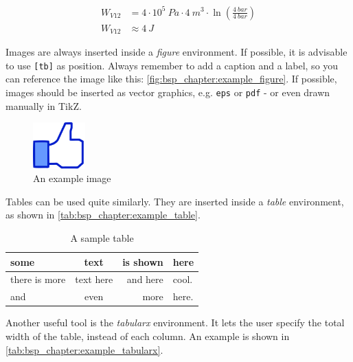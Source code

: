 \begin{equation}
    \begin{split}
        W_{V12} &= 4 \cdot 10^5\ Pa \cdot 4\ m^3 \cdot \ln(\frac{4\ bar}{4\ bar}) \\
        W_{V12} &\approx 4\ J
    \end{split}
\end{equation}

%
Images are always inserted inside a \emph{figure}
environment. If possible, it is advisable to use \texttt{[tb]} as position.
Always remember to add a caption and a label, so you can reference the image
like this: \autoref{fig:bsp_chapter:example_figure}. If possible, images should be
inserted as vector graphics, e.g. \texttt{eps} or \texttt{pdf} - or even drawn
manually in TikZ.

\begin{figure}[t]
    \centering
    \includegraphics[width=2cm]{chapters/Beispiel/images/thumbs_up.jpg}
    \caption{An example image}
    \label{fig:bsp_chapter:example_figure}
\end{figure}

Tables  can be used quite similarly. They are inserted inside a \emph{table} 
environment, as shown in \autoref{tab:bsp_chapter:example_table}.

\begin{table}[t]
    \centering
    \begin{tabular}{lcrp{4cm}} \toprule
        some          & text      & is shown & here  \\ \midrule
        there is more & text here & and here & cool. \\
        and           & even      & more     & here. \\ \bottomrule
    \end{tabular}
    \caption{A sample table}
    \label{tab:bsp_chapter:example_table}
\end{table}

Another useful tool is the \emph{tabularx} environment. 
It lets the user specify the total width of the table, instead of each column.
An example is shown in \autoref{tab:bsp_chapter:example_tabularx}.

